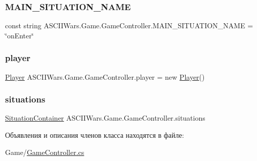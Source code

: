 \subsubsection{\texorpdfstring{M\+A\+I\+N\+\_\+\+S\+I\+T\+U\+A\+T\+I\+O\+N\+\_\+\+N\+A\+ME}{MAIN\_SITUATION\_NAME}}
{\footnotesize\ttfamily const string A\+S\+C\+I\+I\+Wars.\+Game.\+Game\+Controller.\+M\+A\+I\+N\+\_\+\+S\+I\+T\+U\+A\+T\+I\+O\+N\+\_\+\+N\+A\+ME = \char`\"{}on\+Enter\char`\"{}\hspace{0.3cm}{\ttfamily [private]}}

\hypertarget{class_a_s_c_i_i_wars_1_1_game_1_1_game_controller_a16a24596b98a17361e430d984f85a7ca}{}\label{class_a_s_c_i_i_wars_1_1_game_1_1_game_controller_a16a24596b98a17361e430d984f85a7ca} 
\subsubsection{\texorpdfstring{player}{player}}
{\footnotesize\ttfamily \hyperlink{class_a_s_c_i_i_wars_1_1_game_1_1_player}{Player} A\+S\+C\+I\+I\+Wars.\+Game.\+Game\+Controller.\+player = new \hyperlink{class_a_s_c_i_i_wars_1_1_game_1_1_player}{Player}()}

\hypertarget{class_a_s_c_i_i_wars_1_1_game_1_1_game_controller_aaab40310e11bd03711896ec5685ebe10}{}\label{class_a_s_c_i_i_wars_1_1_game_1_1_game_controller_aaab40310e11bd03711896ec5685ebe10} 
\subsubsection{\texorpdfstring{situations}{situations}}
{\footnotesize\ttfamily \hyperlink{class_a_s_c_i_i_wars_1_1_game_1_1_situation_container}{Situation\+Container} A\+S\+C\+I\+I\+Wars.\+Game.\+Game\+Controller.\+situations}



Объявления и описания членов класса находятся в файле\+:\begin{DoxyCompactItemize}
\item 
Game/\hyperlink{_game_controller_8cs}{Game\+Controller.\+cs}\end{DoxyCompactItemize}
